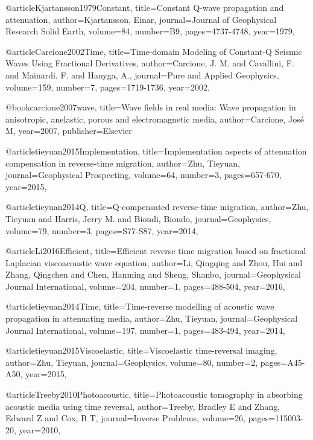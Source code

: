 {@article{Kjartansson1979Constant,
  title={Constant {Q}-wave propagation and attenuation},
  author={Kjartansson, Einar},
  journal={Journal of Geophysical Research Solid Earth},
  volume={84},
  number={B9},
  pages={4737-4748},
  year={1979},
}

@article{Carcione2002Time,
  title={Time-domain Modeling of Constant-{Q} Seismic Waves Using Fractional Derivatives},
  author={Carcione, J. M. and Cavallini, F. and Mainardi, F. and Hanyga, A.},
  journal={Pure and Applied Geophysics},
  volume={159},
  number={7},
  pages={1719-1736},
  year={2002},
}

@book{carcione2007wave,
  title={Wave fields in real media: Wave propagation in anisotropic, anelastic, porous and electromagnetic media},
  author={Carcione, Jos{\'e} M},
  year={2007},
  publisher={Elsevier}
}

@article{tieyuan2015Implementation,
  title={Implementation aspects of attenuation compensation in reverse‐time migration},
  author={Zhu, Tieyuan},
  journal={Geophysical Prospecting},
  volume={64},
  number={3},
  pages={657-670},
  year={2015},
}

@article{tieyuan2014Q,
  title={Q-compensated reverse-time migration},
  author={Zhu, Tieyuan and Harris, Jerry M. and Biondi, Biondo},
  journal={Geophysics},
  volume={79},
  number={3},
  pages={S77-S87},
  year={2014},
}

@article{Li2016Efficient,
  title={Efficient reverse time migration based on fractional {L}aplacian viscoacoustic wave equation},
  author={Li, Qingqing and Zhou, Hui and Zhang, Qingchen and Chen, Hanming and Sheng, Shanbo},
  journal={Geophysical Journal International},
  volume={204},
  number={1},
  pages={488-504},
  year={2016},
}

@article{tieyuan2014Time,
  title={Time-reverse modelling of acoustic wave propagation in attenuating media},
  author={Zhu, Tieyuan},
  journal={Geophysical Journal International},
  volume={197},
  number={1},
  pages={483-494},
  year={2014},
}

@article{tieyuan2015Viscoelastic,
  title={Viscoelastic time-reversal imaging},
  author={Zhu, Tieyuan},
  journal={Geophysics},
  volume={80},
  number={2},
  pages={A45-A50},
  year={2015},
}

@article{Treeby2010Photoacoustic,
  title={Photoacoustic tomography in absorbing acoustic media using time reversal},
  author={Treeby, Bradley E and Zhang, Edward Z and Cox, B T},
  journal={Inverse Problems},
  volume={26},
  pages={115003-20},
  year={2010},
}

}
